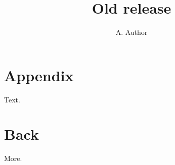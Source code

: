 \documentclass[preprint]{elsarticle}
\begin{document}
\begin{frontmatter}
\title{Old release}
\author{A. Author}
\end{frontmatter}
\begin{nomenclature}
\begin{deflist}[A]
\end{deflist}
\end{nomenclature}
\appendix
\section{Appendix}
Text.
\normalMode
\section{Back}
More.
\end{document}
